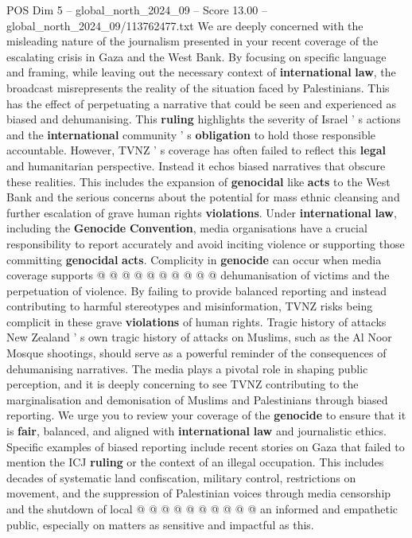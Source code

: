 \begin{textsample}{POS Dim 5 – global\_north\_2024\_09 – Score 13.00 – global\_north\_2024\_09/113762477.txt}  \label{ex:f5_pos_320}
We are deeply concerned with the misleading nature of the journalism presented in your recent coverage of the escalating crisis in Gaza and the West Bank.
By focusing on specific language and framing, while leaving out the necessary context of \textbf{international} \textbf{law}, the broadcast misrepresents the reality of the situation faced by Palestinians.
This has the effect of perpetuating a narrative that could be seen and experienced as biased and dehumanising.
This \textbf{ruling} highlights the severity of Israel ' s actions and the \textbf{international} community ' s \textbf{obligation} to hold those responsible accountable.
However, TVNZ ' s coverage has often failed to reflect this \textbf{legal} and humanitarian perspective.
Instead it echos biased narratives that obscure these realities.
This includes the expansion of \textbf{genocidal} like \textbf{acts} to the West Bank and the serious concerns about the potential for mass ethnic cleansing and further escalation of grave human rights \textbf{violations}.
Under \textbf{international} \textbf{law}, including the \textbf{Genocide} \textbf{Convention}, media organisations have a crucial responsibility to report accurately and avoid inciting violence or supporting those committing \textbf{genocidal} \textbf{acts}.
Complicity in \textbf{genocide} can occur when media coverage supports @ @ @ @ @ @ @ @ @ @ dehumanisation of victims and the perpetuation of violence.
By failing to provide balanced reporting and instead contributing to harmful stereotypes and misinformation, TVNZ risks being complicit in these grave \textbf{violations} of human rights.
Tragic history of attacks New Zealand ' s own tragic history of attacks on Muslims, such as the Al Noor Mosque shootings, should serve as a powerful reminder of the consequences of dehumanising narratives.
The media plays a pivotal role in shaping public perception, and it is deeply concerning to see TVNZ contributing to the marginalisation and demonisation of Muslims and Palestinians through biased reporting.
We urge you to review your coverage of the \textbf{genocide} to ensure that it is \textbf{fair}, balanced, and aligned with \textbf{international} \textbf{law} and journalistic ethics.
Specific examples of biased reporting include recent stories on Gaza that failed to mention the ICJ \textbf{ruling} or the context of an illegal occupation.
This includes decades of systematic land confiscation, military control, restrictions on movement, and the suppression of Palestinian voices through media censorship and the shutdown of local @ @ @ @ @ @ @ @ @ @ an informed and empathetic public, especially on matters as sensitive and impactful as this.

\end{textsample}

